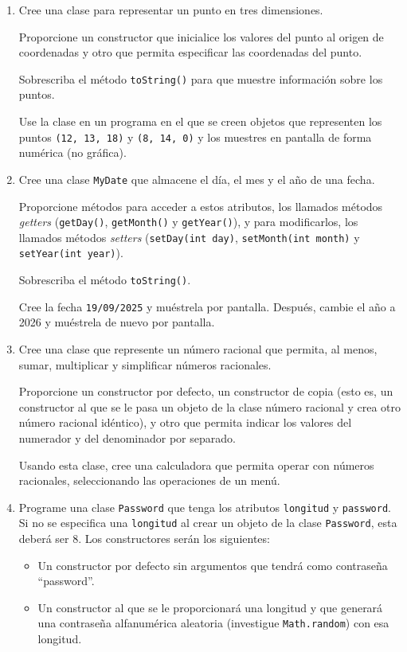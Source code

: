 \documentclass[a4paper]{article}
\newcommand{\code}[1]{\texttt{#1}}
\begin{document}
\begin{enumerate}
    \item Cree una clase para representar un punto en tres dimensiones.
    
    Proporcione un constructor que inicialice los valores del punto al origen de coordenadas y otro que permita especificar las coordenadas del punto.
    
    Sobrescriba el método \code{toString()} para que muestre información sobre los puntos.
    
    Use la clase en un programa en el que se creen objetos que representen los puntos \code{(12, 13, 18)} y \code{(8, 14, 0)} y los muestres en pantalla de forma numérica (no gráfica).
    
    \item Cree una clase \code{MyDate} que almacene el día, el mes y el año de una fecha.
    
    Proporcione métodos para acceder a estos atributos, los llamados métodos \textit{getters} (\code{getDay()}, \code{getMonth()} y \code{getYear()}), y para modificarlos, los llamados métodos \textit{setters} (\code{setDay(int day)}, \code{setMonth(int month)} y \code{setYear(int year)}).
    
    Sobrescriba el método \code{toString()}.
    
    Cree la fecha \code{19/09/2025} y muéstrela por pantalla. Después, cambie el año a 2026 y muéstrela de nuevo por pantalla.
    
    \item Cree una clase que represente un número racional que permita, al menos, sumar, multiplicar y simplificar números racionales.
    
    Proporcione un constructor por defecto, un constructor de copia (esto es, un constructor al que se le pasa un objeto de la clase número racional y crea otro número racional idéntico), y otro que permita indicar los valores del numerador y del denominador por separado.
    
    Usando esta clase, cree una calculadora que permita operar con números racionales, seleccionando las operaciones de un menú.
    
    \item Programe una clase \code{Password} que tenga los atributos \code{longitud} y \code{password}. Si no se especifica una \code{longitud} al crear un objeto de la clase \code{Password}, esta deberá ser 8. Los constructores serán los siguientes:

    \begin{itemize}
        \item Un constructor por defecto sin argumentos que tendrá como contraseña ``password''.
        \item Un constructor al que se le proporcionará una longitud y que generará una contraseña alfanumérica aleatoria (investigue \code{Math.random}) con esa longitud.
    \end{itemize}


\end{enumerate}
\end{document}
